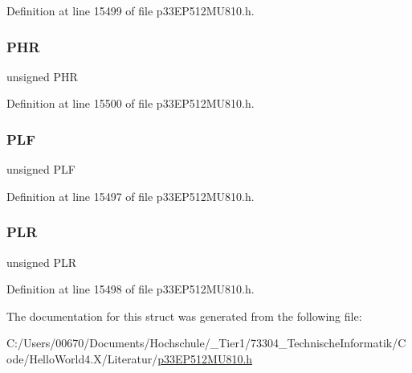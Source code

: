 Definition at line 15499 of file p33\+E\+P512\+M\+U810.\+h.

\mbox{\label{structtag_l_e_b_c_o_n6_b_i_t_s_ae02a9c6926c3a1feac21cec18a520e4a}} 
\subsubsection{\texorpdfstring{P\+HR}{PHR}}
{\footnotesize\ttfamily unsigned P\+HR}



Definition at line 15500 of file p33\+E\+P512\+M\+U810.\+h.

\mbox{\label{structtag_l_e_b_c_o_n6_b_i_t_s_ab72be8b35e01107182afb8e9733d72bb}} 
\subsubsection{\texorpdfstring{P\+LF}{PLF}}
{\footnotesize\ttfamily unsigned P\+LF}



Definition at line 15497 of file p33\+E\+P512\+M\+U810.\+h.

\mbox{\label{structtag_l_e_b_c_o_n6_b_i_t_s_a5f690459b53fc81b46dbbac226cecb25}} 
\subsubsection{\texorpdfstring{P\+LR}{PLR}}
{\footnotesize\ttfamily unsigned P\+LR}



Definition at line 15498 of file p33\+E\+P512\+M\+U810.\+h.



The documentation for this struct was generated from the following file\+:\begin{DoxyCompactItemize}
\item 
C\+:/\+Users/00670/\+Documents/\+Hochschule/\+\_\+\+Tier1/73304\+\_\+\+Technische\+Informatik/\+Code/\+Hello\+World4.\+X/\+Literatur/\hyperlink{p33_e_p512_m_u810_8h}{p33\+E\+P512\+M\+U810.\+h}\end{DoxyCompactItemize}
